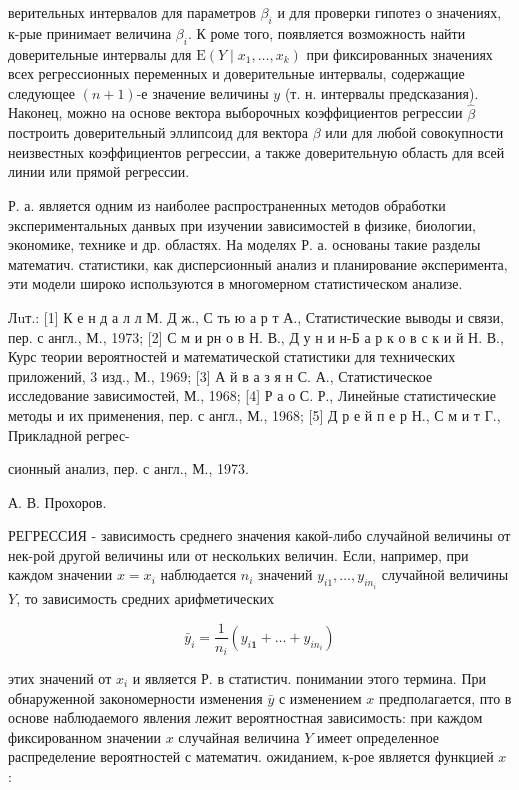 \documentclass[10pt]{article}
\begin{document}
верительных интервалов для параметров $\beta_{i}$ и для проверки гипотез о значениях, к-рые принимает величина $\beta_{i}$. К роме того, появляется возможность найти доверительные интервалы для $\mathrm{E}\left(Y \mid x_{1}, \ldots, x_{k}\right)$ при фиксированных значениях всех регрессионных переменных и доверительные интервалы, содержащие следующее $(n+1)$-е значение величины $y$ (т. н. интервалы предсказания). Наконец, можно на основе вектора выборочных коэффициентов регрессии $\widehat{\beta}$ построить доверительный эллипсоид для вектора $\beta$ или для любой совокупности неизвестных коэффициентов регрессии, а также доверительную область для всей линии или прямой регрессии.



Р. а. является одним из наиболее распространенных методов обработки экспериментальных данвых при изучении зависимостей в физике, биологии, экономике, технике и др. областях. На моделях Р. а. основаны такие разделы математич. статистики, как дисперсионный анализ и планирование әксперимента, эти модели широко используются в многомерном статистическом анализе.



Лuт.: [1] К е н д а л л М. Д ж., С ть ю а р т А., Статистические выводы и связи, пер. с англ., М., 1973; [2] С м и рн о в Н. В., Д у н и н-Б а р к о в с к и й Н. В., Курс теории вероятностей и математической статистики для технических приложений, 3 изд., М., 1969; [3] А й в а з я н С. А., Статистическое исследование зависимостей, М., 1968; [4] Р а о С. Р., Линейные статистические методы и их применения, пер. с англ., М., 1968; [5] Д р е й п е р Н., С м и т Г., Прикладной регрес-

сионный анализ, пер. с англ., М., 1973.

А. В. Прохоров.



РЕГРЕССИЯ - зависимость среднего значения какой-либо случайной величины от нек-рой другой величины или от нескольких величин. Если, например, при каждом значении $x=x_{i}$ наблюдается $n_{i}$ значений $y_{i 1}, \ldots, y_{i n_{i}}$ случайной величины $Y$, то зависимость средних арифметических



\[

\bar{y}_{i}=\frac{1}{n_{i}}\left(y_{i \mathbf{1}}+\ldots+y_{i n_{i}}\right)

\]



этих значений от $x_{i}$ и является Р. в статистич. понимании этого термина. При обнаруженной закономерности изменения $\bar{y}$ с изменением $x$ предполагается, пто в основе наблюдаемого явления лежит вероятностная зависимость: при каждом фиксированном значении $x$ случайная величина $Y$ имеет определенное распределение вероятностей с математич. ожиданием, к-рое является функцией $x$ :
\end{document}
